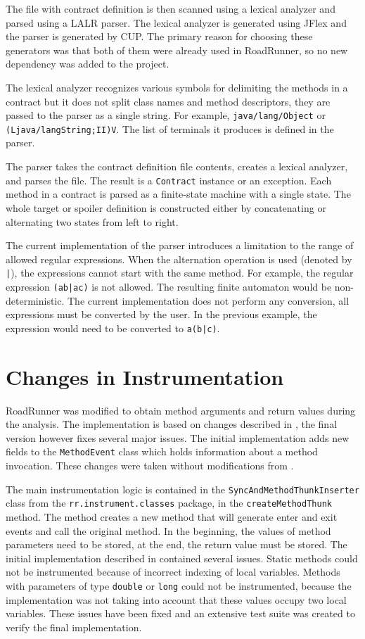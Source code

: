 The file with contract definition is then scanned using a lexical analyzer and
parsed using a LALR parser. The lexical analyzer is generated using JFlex and
the parser is generated by CUP. The primary reason for choosing these generators
was that both of them were already used in RoadRunner, so no new dependency was
added to the project.

The lexical analyzer recognizes various symbols for delimiting the methods in a
contract but it does not split class names and method descriptors, they are
passed to the parser as a single string. For example, \texttt{java/lang/Object}
or \texttt{(Ljava/langString;II)V}. The list of terminals it produces is defined
in the parser.

The parser takes the contract definition file contents, creates a lexical
analyzer, and parses the file. The result is a \texttt{Contract} instance or an
exception. Each method in a contract is parsed as a finite-state machine with a
single state. The whole target or spoiler definition is constructed either by
concatenating or alternating two states from left to right.

The current implementation of the parser introduces a limitation to the range of
allowed regular expressions. When the alternation operation is used (denoted by
\texttt{|}), the expressions cannot start with the same method. For example, the
regular expression \texttt{(ab|ac)} is not allowed. The resulting finite
automaton would be non-deterministic. The current implementation does not
perform any conversion, all expressions must be converted by the user. In the
previous example, the expression would need to be converted to \texttt{a(b|c)}.

\section{Changes in Instrumentation}
\label{instrImpl}
RoadRunner was modified to obtain method arguments and return values during the
analysis. The implementation is based on changes described in \cite{janousek},
the final version however fixes several major issues. The initial implementation
adds new fields to the \texttt{MethodEvent} class which holds information about
a method invocation. These changes were taken without modifications from
\cite{janousek}.

The main instrumentation logic is contained in the
\texttt{SyncAndMethodThunkInserter} class from the
\texttt{rr.instrument.classes} package, in the \texttt{createMethodThunk}
method. The method creates a new method that will generate enter and exit events
and call the original method. In the beginning, the values of method parameters
need to be stored, at the end, the return value must be stored. The initial
implementation described in \cite{janousek} contained several issues. Static
methods could not be instrumented because of incorrect indexing of local
variables. Methods with parameters of type \texttt{double} or \texttt{long}
could not be instrumented, because the implementation was not taking into
account that these values occupy two local variables. These issues have been
fixed and an extensive test suite was created to verify the final
implementation.

